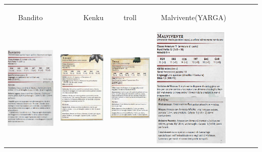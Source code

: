 \documentclass{article}
\begin{document}
\begin{table}
\begin{tabular}{|cr|cr|cr|cr|}
        \hline 
        \hypertarget{bandito}{Bandito} & \hypertarget{kenk}{Kenku} &  \hypertarget{troll}{troll} &  \hypertarget{malvivente}{Malvivente(YARGA)}\\
        \includegraphics[width=4cm, height = 6 cm]{../Mostri/Bandito.PNG} & \includegraphics[width=4cm, height = 6 cm]{../Mostri/Kenku.PNG} & \includegraphics[width=4cm, height = 6 cm]{../Mostri/Troll.PNG} & \includegraphics[width=4cm, height = 6 cm]{../Mostri/Malvivente.PNG}
        
    \end{tabular}
\end{table}
\end{document}
